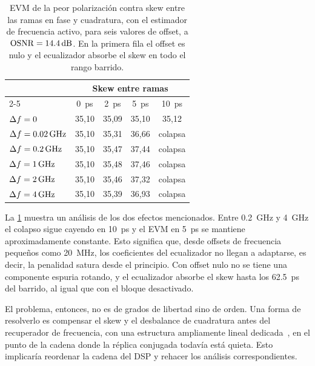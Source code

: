 \begin{table}[htbp]
  \centering

  \begin{tabular}{lcccc}
    \toprule
    & \multicolumn{4}{c}{Skew entre ramas} \\
    \cmidrule(l){2-5}
    & \SI{0}{\pico\second} & \SI{2}{\pico\second} & \SI{5}{\pico\second}
    & \SI{10}{\pico\second} \\
    \midrule
    $\Delta f = 0$                      & 35,10 & 35,09 & 35,10 & 35,12 \\
    \midrule
    $\Delta f = \SI{0.02}{\giga\hertz}$ & 35,10 & 35,31 & 36,66 & colapsa \\
    $\Delta f = \SI{0.2}{\giga\hertz}$  & 35,10 & 35,47 & 37,44 & colapsa \\
    $\Delta f = \SI{1}{\giga\hertz}$    & 35,10 & 35,48 & 37,46 & colapsa \\
    $\Delta f = \SI{2}{\giga\hertz}$    & 35,10 & 35,46 & 37,32 & colapsa \\
    $\Delta f = \SI{4}{\giga\hertz}$    & 35,10 & 35,39 & 36,93 & colapsa \\
    \bottomrule
  \end{tabular}
  \caption[Origen del l\'imite de skew]{%
    EVM de la peor polarizaci\'on contra skew entre las ramas en fase y
    cuadratura, con el estimador de frecuencia activo, para seis valores de
    offset, a $\OSNR = \SI{14.4}{\dB}$. En la primera fila el offset es nulo y el ecualizador absorbe el
    skew en todo el rango barrido.}
  \label{tab:tol-skew}
\end{table}

La \cref{tab:tol-skew} muestra un an\'alisis de los dos efectos mencionados. Entre
\SI{0.2}{\giga\hertz} y \SI{4}{\giga\hertz} el
colapso sigue cayendo en \SI{10}{\pico\second} y el EVM en
\SI{5}{\pico\second} se mantiene aproximadamente constante. Esto significa que, desde offsets de 
frecuencia peque\~nos como \SI{20}{\mega\hertz}, los coeficientes del ecualizador no llegan a adaptarse, es decir, la penalidad satura desde el principio. Con offset nulo no se tiene una componente espuria rotando, y el ecualizador absorbe el skew hasta los \SI{62.5}{\pico\second} del barrido, al igual que con el bloque desactivado.


El problema, entonces, no es de grados de libertad sino de orden. Una forma de
resolverlo es compensar el skew y el desbalance de cuadratura antes del
recuperador de frecuencia, con una estructura ampliamente lineal
dedicada~\cite{portodasilva2016}, en el punto de la cadena donde la r\'eplica
conjugada todav\'ia est\'a quieta. Esto implicar\'ia reordenar la cadena del
DSP y rehacer los an\'alisis correspondientes.

